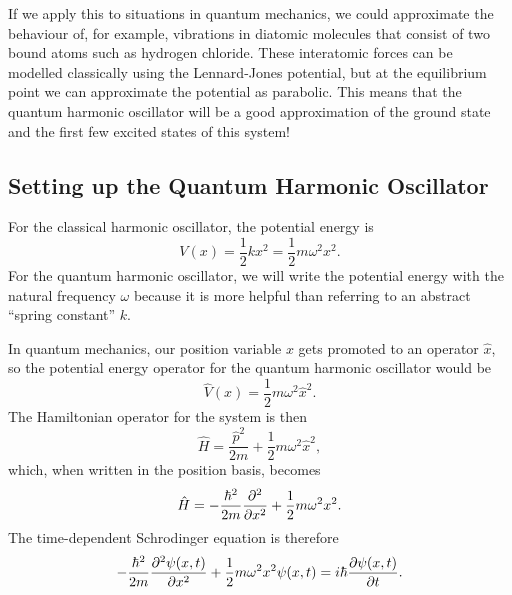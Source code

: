 \documentclass[../quantum_mechanics.tex]{subfiles}
\begin{document}
            If we apply this to situations in quantum mechanics, we could approximate the behaviour of, for example, vibrations in diatomic molecules that consist of two bound atoms such as hydrogen chloride.
            These interatomic forces can be modelled classically using the Lennard-Jones potential, but at the equilibrium point we can approximate the potential as parabolic.
            This means that the quantum harmonic oscillator will be a good approximation of the ground state and the first few excited states of this system!

        \subsection{Setting up the Quantum Harmonic Oscillator}\label{subsec:setting-up-the-quantum-harmonic-oscillator}
            For the classical harmonic oscillator, the potential energy is
            \begin{equation}
                V(x)=\frac{1}{2}kx^2=\frac{1}{2}m\omega^2x^2.
            \end{equation}
            For the quantum harmonic oscillator, we will write the potential energy with the natural frequency $\omega$ because it is more helpful than referring to an abstract ``spring constant'' $k$.
            
            In quantum mechanics, our position variable $x$ gets promoted to an operator $\hat{x}$, so the potential energy operator for the quantum harmonic oscillator would be
            \begin{equation}
                \hat{V}(x)=\frac{1}{2}m\omega^2\hat{x}^2.
            \end{equation}
            The Hamiltonian operator for the system is then
            \begin{equation}
                \hat{H}=\frac{\hat{p}^2}{2m}+\frac{1}{2}m\omega^2\hat{x}^2,
            \end{equation}
            which, when written in the position basis, becomes
            \begin{equation}
                \hat{H}=-\frac{\hbar^2}{2m}\pdv[2]{}{x}+\frac{1}{2}m\omega^2x^2.
            \end{equation}
            The time-dependent Schrodinger equation is therefore
            \begin{equation}
                -\frac{\hbar^2}{2m}\pdv[2]{\psi(x,t)}{x}+\frac{1}{2}m\omega^2x^2\psi(x,t)=i\hbar\pdv{\psi(x,t)}{t}.
            \end{equation}
            
\end{document}
